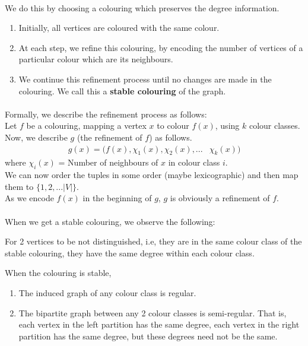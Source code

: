 \paragraph*{}
We do this by choosing a colouring which preserves the degree information. 
\begin{enumerate}
\item Initially, all vertices are coloured with the same colour.
\item At each step, we refine this colouring, by encoding the number of vertices of a particular colour which are its neighbours. 
\item We continue this refinement process until no changes are made in the colouring. We call this a \textbf{stable colouring} of the graph.
\end{enumerate}
\paragraph*{}
Formally, we describe the refinement process as follows:\\
Let $f$ be a colouring, mapping a vertex $x$ to colour $f(x)$, using $k$ colour classes. Now, we describe $g$ (the refinement of $f$) as follows.
\begin{eqnarray*}
g(x) = (f(x), \chi_1(x), \chi_2(x), ... & \chi_k(x))
\end{eqnarray*}
where $\chi_i(x)$ = Number of neighbours of $x$ in colour class $i$.\\  
We can now order the tuples in some order (maybe lexicographic) and then map them to $\{1, 2, ... |V|\}$.\\
As we encode $f(x)$ in the beginning of $g$, $g$ is obviously a refinement of $f$.
\paragraph*{}
When we get a stable colouring, we observe the following:
\begin{observation}
For 2 vertices to be not distinguished, i.e, they are in the same colour class of the stable colouring, they have the same degree within each colour class. 
\end{observation}
\begin{observation}
When the colouring is stable, 
\begin{enumerate}
\item The induced graph of any colour class is regular.
\item The bipartite graph between any 2 colour classes is semi-regular. That is, each vertex in the left partition has the same degree, each vertex in the right partition has the same degree, but these degrees need not be the same.
\end{enumerate} 
\end{observation}

